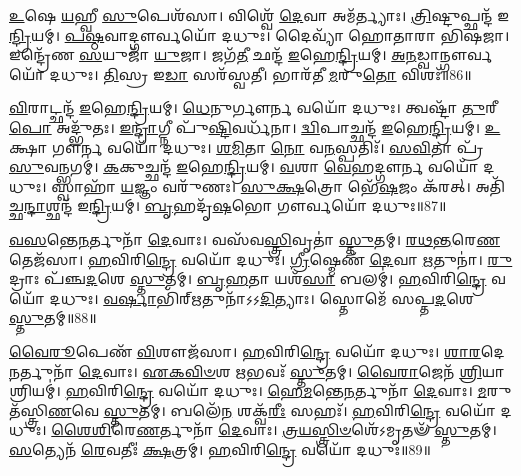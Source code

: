 \-\ul{𑌉}\-𑌷𑍇 \ul{𑌯}\-𑌹𑍍𑌵𑍀 \ul{𑌸𑍁}\-𑌪𑍇𑌶᳴𑌸𑌾।
𑌵𑌿𑌶𑍍𑌵𑍇᳴ \ul{𑌦𑍇}\-𑌵𑌾 𑌅𑌮᳴𑌰𑍍𑌤𑍍𑌯𑌾𑌃।
\-\ul{𑌤𑍍𑌰𑌿}\-𑌷𑍍𑌟𑍁𑌪𑍍𑌛𑌨𑍍𑌦᳴ 𑌇\-\ul{𑌨𑍍𑌦𑍍𑌰𑌿}\-𑌯𑌮𑍍।
\-\ul{𑌪}\-\-\ul{𑌷𑍍𑌠}\-𑌵𑌾𑌦𑍍𑌗𑍗𑌰𑍍𑌵𑌯𑍋᳴ 𑌦𑌧𑍁𑌃।
𑌦𑍈𑌵𑍍𑌯𑌾᳴ 𑌹𑍋𑌤𑌾𑌰𑌾 𑌭𑌿𑌷𑌜𑌾।
𑌇𑌨𑍍𑌦𑍍𑌰𑍇᳴𑌣 \ul{𑌸}\-𑌯𑍁𑌜𑌾᳴ \ul{𑌯𑍁}\-𑌜𑌾।
𑌜𑌗᳴\-\ul{𑌤𑍀} 𑌛𑌨𑍍𑌦᳴ \ul{𑌇}\-𑌹𑍇\-\ul{𑌨𑍍𑌦𑍍𑌰𑌿}\-𑌯𑌮𑍍।
\-\ul{𑌅}\-\-\ul{𑌨}\-𑌡𑍍𑌵𑌾𑌨𑍍𑌗𑍗𑌰𑍍𑌵𑌯𑍋᳴ 𑌦𑌧𑍁𑌃।
\-\ul{𑌤𑌿}\-𑌸𑍍𑌰 𑌇\-\ul{𑌡𑌾} 𑌸𑌰᳴𑌸𑍍𑌵𑌤𑍀।
𑌭𑌾𑌰᳴𑌤𑍀 \ul{𑌮}\-𑌰𑍁\-\ul{𑌤𑍋} 𑌵𑌿𑌶𑌃᳴॥86॥

\-\ul{𑌵𑌿}\-𑌰𑌾𑌟𑍍𑌛𑌨𑍍𑌦᳴ \ul{𑌇}\-𑌹𑍇\-\ul{𑌨𑍍𑌦𑍍𑌰𑌿}\-𑌯𑌮𑍍।
\-\ul{𑌧𑍇}\-𑌨𑍁𑌰𑍍𑌗𑍗𑌰𑍍𑌨 𑌵𑌯𑍋᳴ 𑌦𑌧𑍁𑌃।
𑌤𑍍𑌵𑌷𑍍𑌟𑌾᳴ \ul{𑌤𑍁}\-𑌰𑍀\-\ul{𑌪𑍋} 𑌅𑌦𑍍𑌭𑍁᳴𑌤𑌃।
\-\ul{𑌇}\-\-\ul{𑌨𑍍𑌦𑍍𑌰𑌾}\-𑌗𑍍𑌨𑍀 𑌪𑍁᳴\-\ul{𑌷𑍍𑌟𑌿}\-𑌵𑌰𑍍𑌧᳴𑌨𑌾।
\-\ul{𑌦𑍍𑌵𑌿}\-𑌪𑌾𑌚𑍍𑌛𑌨𑍍𑌦᳴ \ul{𑌇}\-𑌹𑍇\-\ul{𑌨𑍍𑌦𑍍𑌰𑌿}\-𑌯𑌮𑍍।
\-\ul{𑌉}\-𑌕𑍍𑌷𑌾 𑌗𑍗𑌰𑍍𑌨 𑌵𑌯𑍋᳴ 𑌦𑌧𑍁𑌃।
\-\ul{𑌶}\-\-\ul{𑌮𑌿}\-𑌤𑌾 \ul{𑌨𑍋} 𑌵\-\ul{𑌨}\-𑌸𑍍𑌪𑌤𑌿𑌃᳴।
\-\ul{𑌸}\-\-\ul{𑌵𑌿}\-𑌤𑌾 𑌪𑍍𑌰᳴\-\ul{𑌸𑍁}\-𑌵𑌨𑍍𑌭𑌗𑌮𑍍॑।
\-\ul{𑌕}\-𑌕𑍁𑌚𑍍𑌛𑌨𑍍𑌦᳴ \ul{𑌇}\-𑌹𑍇\-\ul{𑌨𑍍𑌦𑍍𑌰𑌿}\-𑌯𑌮𑍍।
\-\ul{𑌵}\-𑌶𑌾 \ul{𑌵𑍇}\-𑌹𑌦𑍍𑌗𑍗𑌰𑍍𑌨 𑌵𑌯𑍋᳴ 𑌦𑌧𑍁𑌃।
𑌸𑍍𑌵𑌾𑌹𑌾᳴ \ul{𑌯}\-𑌜𑍍𑌞𑌂 𑌵𑌰𑍁᳴𑌣𑌃।
\-\ul{𑌸𑍁}\-\-\ul{𑌕𑍍𑌷}\-𑌤𑍍𑌰𑍋 𑌭𑍇᳴\-\ul{𑌷}\-𑌜𑌂 𑌕᳴𑌰𑌤𑍍।
𑌅𑌤𑌿᳴𑌚𑍍𑌛\-\ul{𑌨𑍍𑌦𑌾}\-𑌶𑍍𑌛𑌨𑍍𑌦᳴ 𑌇\-\ul{𑌨𑍍𑌦𑍍𑌰𑌿}\-𑌯𑌮𑍍।
\-\ul{𑌬𑍃}\-𑌹𑌦𑍃᳴\-\ul{𑌷}\-𑌭𑍋 𑌗𑍗𑌰𑍍𑌵𑌯𑍋᳴ 𑌦𑌧𑍁𑌃॥87॥\anuvakamend[𑌅𑌮᳴𑌰𑍍𑌤𑍍𑌯𑌸𑍍𑌤𑍁\-\ul{𑌰𑍍𑌯}\-𑌵𑌾𑌡𑍍𑌗𑍗𑌰𑍍𑌵𑌯𑍋᳴ 𑌦\-\ul{𑌧𑍁}\-𑌰𑍍𑌵𑌿𑌶𑍋᳴ \ul{𑌵}\-𑌶𑌾 \ul{𑌵𑍇}\-𑌹𑌦𑍍𑌗𑍗𑌰𑍍𑌨 𑌵𑌯𑍋᳴ 𑌦𑌧𑍁\-\ul{𑌶𑍍𑌚}\-𑌤𑍍𑌵𑌾𑌰𑌿᳴ 𑌚]

\-\ul{𑌵}\-\-\ul{𑌸}\-𑌨𑍍𑌤𑍇\-\ul{𑌨}\-𑌰𑍍𑌤𑍁𑌨𑌾᳴ \ul{𑌦𑍇}\-𑌵𑌾𑌃।
𑌵𑌸᳴𑌵\-\ul{𑌸𑍍𑌤𑍍𑌰𑌿}\-𑌵𑍃𑌤𑌾॑ \ul{𑌸𑍍𑌤𑍁}\-𑌤𑌮𑍍।
\-\ul{𑌰}\-\-\ul{𑌥}\-\-\ul{𑌨𑍍𑌤}\-𑌰𑍇\-\ul{𑌣} 𑌤𑍇𑌜᳴𑌸𑌾।
\-\ul{𑌹}\-𑌵𑌿𑌰𑌿\-\ul{𑌨𑍍𑌦𑍍𑌰𑍇} 𑌵𑌯𑍋᳴ 𑌦𑌧𑍁𑌃।
\-\ul{𑌗𑍍𑌰𑍀}\-𑌷𑍍𑌮𑍇𑌣᳴ \ul{𑌦𑍇}\-𑌵𑌾 \ul{𑌋}\-𑌤𑍁𑌨𑌾॑।
\-\ul{𑌰𑍁}\-𑌦𑍍𑌰𑌾𑌃 𑌪᳴𑌞𑍍𑌚\-\ul{𑌦}\-𑌶𑍇 \ul{𑌸𑍍𑌤𑍁}\-𑌤𑌮𑍍।
\-\ul{𑌬𑍃}\-\-\ul{𑌹}\-𑌤𑌾 𑌯𑌶᳴\-\ul{𑌸𑌾} 𑌬𑌲𑌮𑍍॑।
\-\ul{𑌹}\-𑌵𑌿𑌰𑌿\-\ul{𑌨𑍍𑌦𑍍𑌰𑍇} 𑌵𑌯𑍋᳴ 𑌦𑌧𑍁𑌃।
\-\ul{𑌵}\-\-\ul{𑌰𑍍}\-𑌷𑌾𑌭𑌿᳴𑌰𑍍\mbox{}\-\ul{𑌋}\-𑌤𑍁𑌨𑌾᳴\-𑌽𑌽\-\ul{𑌦𑌿}\-𑌤𑍍𑌯𑌾𑌃।
𑌸𑍍𑌤𑍋𑌮𑍇᳴ 𑌸𑌪𑍍𑌤\-\ul{𑌦}\-𑌶𑍇 \ul{𑌸𑍍𑌤𑍁}\-𑌤𑌮𑍍॥88॥

\-\ul{𑌵𑍈}\-\-\ul{𑌰𑍂}\-𑌪𑍇𑌣᳴ \ul{𑌵𑌿}\-𑌶𑍗𑌜᳴𑌸𑌾।
\-\ul{𑌹}\-𑌵𑌿𑌰𑌿\-\ul{𑌨𑍍𑌦𑍍𑌰𑍇} 𑌵𑌯𑍋᳴ 𑌦𑌧𑍁𑌃।
\-\ul{𑌶𑌾}\-\-\ul{𑌰}\-𑌦𑍇\-\ul{𑌨}\-𑌰𑍍𑌤𑍁𑌨𑌾᳴ \ul{𑌦𑍇}\-𑌵𑌾𑌃।
\-\ul{𑌏}\-\-\ul{𑌕}\-\-\ul{𑌵𑌿}\-\-\ul{𑍞}\-𑌶 \ul{𑌋}\-𑌭𑌵𑌃᳴ \ul{𑌸𑍍𑌤𑍁}\-𑌤𑌮𑍍।
\-\ul{𑌵𑍈}\-\-\ul{𑌰𑌾}\-𑌜𑍇𑌨᳴ \ul{𑌶𑍍𑌰𑌿}\-𑌯𑌾 𑌶𑍍𑌰𑌿𑌯𑌮𑍍॑।
\-\ul{𑌹}\-𑌵𑌿𑌰𑌿\-\ul{𑌨𑍍𑌦𑍍𑌰𑍇} 𑌵𑌯𑍋᳴ 𑌦𑌧𑍁𑌃।
\-\ul{𑌹𑍇}\-\-\ul{𑌮}\-𑌨𑍍𑌤𑍇\-\ul{𑌨}\-𑌰𑍍𑌤𑍁𑌨𑌾᳴ \ul{𑌦𑍇}\-𑌵𑌾𑌃।
\-\ul{𑌮}\-𑌰𑍁𑌤᳴𑌸𑍍𑌤𑍍𑌰𑌿\-\ul{𑌣}\-𑌵𑍇 \ul{𑌸𑍍𑌤𑍁}\-𑌤𑌮𑍍।
𑌬𑌲𑍇᳴\-\ul{𑌨} 𑌶𑌕𑍍𑌵᳴\-\ul{𑌰𑍀𑌃} 𑌸𑌹𑌃᳴।
\-\ul{𑌹}\-𑌵𑌿𑌰𑌿\-\ul{𑌨𑍍𑌦𑍍𑌰𑍇} 𑌵𑌯𑍋᳴ 𑌦𑌧𑍁𑌃।
\-\ul{𑌶𑍈}\-\-\ul{𑌶𑌿}\-𑌰𑍇\-\ul{𑌣}\-𑌰𑍍𑌤𑍁𑌨𑌾᳴ \ul{𑌦𑍇}\-𑌵𑌾𑌃।
\-\ul{𑌤𑍍𑌰}\-\-\ul{𑌯}\-\-\ul{𑌸𑍍𑌤𑍍𑌰𑌿}\-\-\ul{𑍞}\-𑌶𑍇᳴\-𑌽𑌮𑍃𑌤𑍟᳴ \ul{𑌸𑍍𑌤𑍁}\-𑌤𑌮𑍍।
\-\ul{𑌸}\-𑌤𑍍𑌯𑍇𑌨᳴ \ul{𑌰𑍇}\-𑌵𑌤𑍀𑌃॑ \ul{𑌕𑍍𑌷}\-𑌤𑍍𑌰𑌮𑍍।
\-\ul{𑌹}\-𑌵𑌿𑌰𑌿\-\ul{𑌨𑍍𑌦𑍍𑌰𑍇} 𑌵𑌯𑍋᳴ 𑌦𑌧𑍁𑌃॥89॥\anuvakamend[𑌸𑍍𑌤𑍋𑌮𑍇᳴ 𑌸𑌪𑍍𑌤\-\ul{𑌦}\-𑌶𑍇 \ul{𑌸𑍍𑌤𑍁}\-𑌤𑍞 𑌸𑌹𑍋᳴ \ul{𑌹}\-𑌵𑌿𑌰𑌿\-\ul{𑌨𑍍𑌦𑍍𑌰𑍇} 𑌵𑌯𑍋᳴ 𑌦𑌧𑍁\-\ul{𑌶𑍍𑌚}\-𑌤𑍍𑌵𑌾𑌰𑌿᳴ 𑌚 (\-\ul{𑌵}\-\-\ul{𑌸}\-𑌨𑍍𑌤𑍇𑌨᳴ \ul{𑌗𑍍𑌰𑍀}\-𑌷𑍍𑌮𑍇𑌣᳴ \ul{𑌵}\-𑌰𑍍‌॒\mbox{}𑌷𑌾𑌭𑌿𑌃᳴ 𑌶𑌾\-\ul{𑌰}\-𑌦𑍇𑌨᳴ 𑌹𑍇\-\ul{𑌮}\-𑌨𑍍𑌤𑍇𑌨᳴ 𑌶𑍈\-\ul{𑌶𑌿}\-𑌰𑍇\-\ul{𑌣} 𑌷𑌟𑍍॥)]

